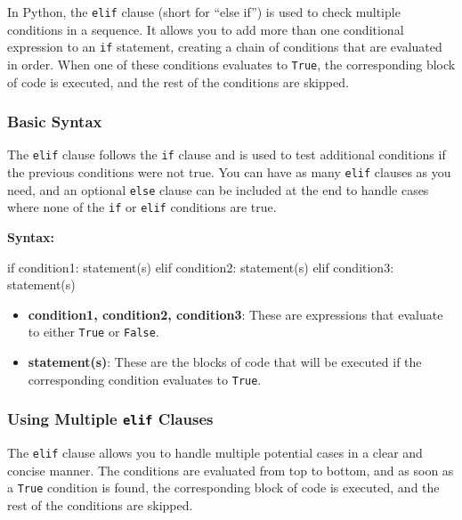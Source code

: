 \documentclass[
  letterpaper,
  DIV=11,
  numbers=noendperiod]{scrreprt}
\newenvironment{Shaded}{\begin{snugshade}}{\end{snugshade}}
\newcommand{\ControlFlowTok}[1]{\textcolor[rgb]{0.00,0.23,0.31}{#1}}
\newcommand{\NormalTok}[1]{\textcolor[rgb]{0.00,0.23,0.31}{#1}}
\providecommand{\tightlist}{%
  \setlength{\itemsep}{0pt}\setlength{\parskip}{0pt}}\usepackage{longtable,booktabs,array}
\begin{document}
In Python, the \texttt{elif} clause (short for ``else if'') is used to
check multiple conditions in a sequence. It allows you to add more than
one conditional expression to an \texttt{if} statement, creating a chain
of conditions that are evaluated in order. When one of these conditions
evaluates to \texttt{True}, the corresponding block of code is executed,
and the rest of the conditions are skipped.

\hypertarget{basic-syntax-2}{%
\subsubsection{Basic Syntax}\label{basic-syntax-2}}

The \texttt{elif} clause follows the \texttt{if} clause and is used to
test additional conditions if the previous conditions were not true. You
can have as many \texttt{elif} clauses as you need, and an optional
\texttt{else} clause can be included at the end to handle cases where
none of the \texttt{if} or \texttt{elif} conditions are true.

\textbf{Syntax:}

\begin{Shaded}
\begin{Highlighting}[]
\ControlFlowTok{if}\NormalTok{ condition1:}
\NormalTok{    statement(s)}
\ControlFlowTok{elif}\NormalTok{ condition2:}
\NormalTok{    statement(s)}
\ControlFlowTok{elif}\NormalTok{ condition3:}
\NormalTok{    statement(s)}
\end{Highlighting}
\end{Shaded}

\begin{itemize}
\tightlist
\item
  \textbf{condition1, condition2, condition3}: These are expressions
  that evaluate to either \texttt{True} or \texttt{False}.
\item
  \textbf{statement(s)}: These are the blocks of code that will be
  executed if the corresponding condition evaluates to \texttt{True}.
\end{itemize}

\hypertarget{using-multiple-elif-clauses}{%
\subsubsection{\texorpdfstring{Using Multiple \texttt{elif}
Clauses}{Using Multiple elif Clauses}}\label{using-multiple-elif-clauses}}

The \texttt{elif} clause allows you to handle multiple potential cases
in a clear and concise manner. The conditions are evaluated from top to
bottom, and as soon as a \texttt{True} condition is found, the
corresponding block of code is executed, and the rest of the conditions
are skipped.
\end{document}
